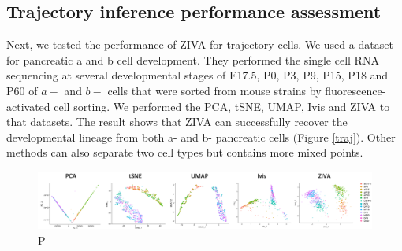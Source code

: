 \subsection{Trajectory inference performance assessment}
Next, we tested the performance of ZIVA for trajectory cells. We used a dataset for pancreatic a and b cell development. They performed the single cell RNA sequencing at several developmental stages of E17.5, P0, P3, P9, P15, P18 and P60 of $a-$ and $b-$ cells that were sorted from mouse strains by fluorescence-activated cell sorting. We performed the PCA, tSNE, UMAP, Ivis and ZIVA to that datasets. The result shows that ZIVA can successfully recover the developmental lineage from both a- and b- pancreatic cells (Figure \ref{traj}). Other methods can also separate two cell types but contains more mixed points.  
\begin{figure}[htb!]
    \centering
    \includegraphics[width=1\textwidth]{figures/myfigures/traj.png}
    \caption{P}
    \label{}
\end{figure}


